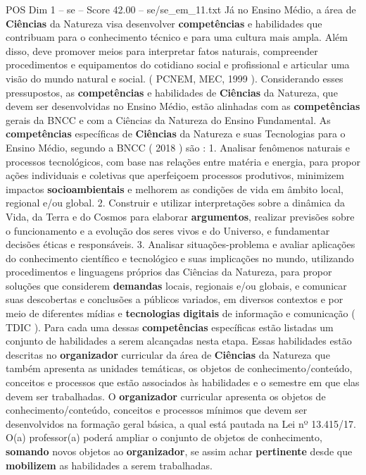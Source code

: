 \begin{textsample}{POS Dim 1 – se – Score 42.00 – se/se\_em\_11.txt}
Já no Ensino Médio, a área de \textbf{Ciências} da Natureza visa desenvolver \textbf{competências} e habilidades que contribuam para o conhecimento técnico e para uma cultura mais ampla.
Além disso, deve promover meios para interpretar fatos naturais, compreender procedimentos e equipamentos do cotidiano social e profissional e articular uma visão do mundo natural e social. ( PCNEM, MEC, 1999 ).
Considerando esses pressupostos, as \textbf{competências} e habilidades de \textbf{Ciências} da Natureza, que devem ser desenvolvidas no Ensino Médio, estão alinhadas com as \textbf{competências} gerais da BNCC e com a Ciências da Natureza do Ensino Fundamental.
As \textbf{competências} específicas de \textbf{Ciências} da Natureza e suas Tecnologias para o Ensino Médio, segundo a BNCC ( 2018 ) são : 1.
Analisar fenômenos naturais e processos tecnológicos, com base nas relações entre matéria e energia, para propor ações individuais e coletivas que aperfeiçoem processos produtivos, minimizem impactos \textbf{socioambientais} e melhorem as condições de vida em âmbito local, regional e/ou global. 2.
Construir e utilizar interpretações sobre a dinâmica da Vida, da Terra e do Cosmos para elaborar \textbf{argumentos}, realizar previsões sobre o funcionamento e a evolução dos seres vivos e do Universo, e fundamentar decisões éticas e responsáveis. 3.
Analisar situações-problema e avaliar aplicações do conhecimento científico e tecnológico e suas implicações no mundo, utilizando procedimentos e linguagens próprios das Ciências da Natureza, para propor soluções que considerem \textbf{demandas} locais, regionais e/ou globais, e comunicar suas descobertas e conclusões a públicos variados, em diversos contextos e por meio de diferentes mídias e \textbf{tecnologias} \textbf{digitais} de informação e comunicação ( TDIC ).
Para cada uma dessas \textbf{competências} específicas estão listadas um conjunto de habilidades a serem alcançadas nesta etapa.
Essas habilidades estão descritas no \textbf{organizador} curricular da área de \textbf{Ciências} da Natureza que também apresenta as unidades temáticas, os objetos de conhecimento/conteúdo, conceitos e processos que estão associados às habilidades e o semestre em que elas devem ser trabalhadas.
O \textbf{organizador} curricular apresenta os objetos de conhecimento/conteúdo, conceitos e processos mínimos que devem ser desenvolvidos na formação geral básica, a qual está pautada na Lei nº 13.415/17.
O(a) professor(a) poderá ampliar o conjunto de objetos de conhecimento, \textbf{somando} novos objetos ao \textbf{organizador}, se assim achar \textbf{pertinente} desde que \textbf{mobilizem} as habilidades a serem trabalhadas.

\end{textsample}
